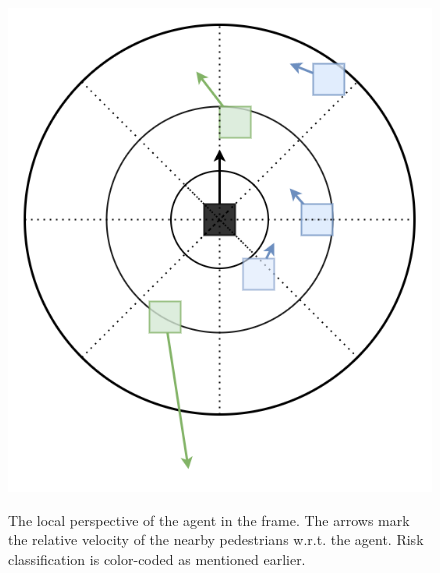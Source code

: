 \begin{figure}[!htbp]
		\centering
		\includegraphics[width=.7\textwidth]{figures/agent_perspective_recreated.png}
		\label{fig:agent-perspective_agent-perspective}
		\caption{The local perspective of the agent in the frame. The arrows mark the relative velocity of the nearby pedestrians w.r.t. the agent. Risk classification is color-coded as mentioned earlier.}
\end{figure}




